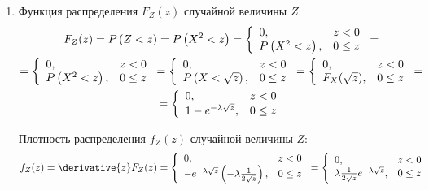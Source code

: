 \documentclass[12pt,a4paper]{article}
\begin{document}
\begin{enumerate}
        \item Функция распределения $F_Z(z)$ случайной величины $Z$:
        \begin{multline}
            F_Z(z) = P \left ( Z < z \right ) = P \left ( X^2 < z \right )
            = \left \{
            \begin{array}{ll}
                0,                     & z < 0   \\
                P \left ( X^2 < z \right ), & 0 \le z
            \end{array}
            \right . = \\
            = \left \{
            \begin{array}{ll}
                0,                     & z < 0   \\
                P \left ( X^2 < z \right ), & 0 \le z
            \end{array}
            \right .
            = \left \{
            \begin{array}{ll}
                0,                          & z < 0   \\
                P \left ( X < \sqrt{z} \right ), & 0 \le z
            \end{array}
            \right .
            = \left \{
            \begin{array}{ll}
                0,             & z < 0   \\
                F_X(\sqrt{z}), & 0 \le z
            \end{array}
            \right . = \\
            = \left \{
            \begin{array}{ll}
                0,                          & z < 0   \\
                1 - e^{- \lambda \sqrt{z}}, & 0 \le z
            \end{array}
            \right .
        \end{multline}

        Плотность распределения $f_Z(z)$ случайной величины $Z$:
        \begin{equation}
            f_Z(z)
            = \derivative{z} F_Z(z)
            = \left \{
            \begin{array}{ll}
                0,                                                                        & z < 0   \\
                - e^{- \lambda \sqrt{z}} \left ( - \lambda \frac{1}{2 \sqrt{z}} \right ), & 0 \le z
            \end{array}
            \right .
            = \left \{
            \begin{array}{ll}
                0,                                                   & z < 0   \\
                \lambda \frac{1}{2 \sqrt{z}} e^{- \lambda \sqrt{z}}, & 0 \le z
            \end{array}
            \right .
        \end{equation}


\end{enumerate}
\end{document}
